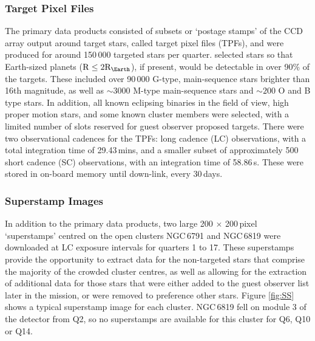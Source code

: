 \subsubsection{Target Pixel Files}
The primary data products consisted of subsets or `postage stamps' of the CCD array output around target stars, called target pixel files (TPFs), and were produced for around 150\,000 targeted stars per quarter. \cite{batalha_selection_2010} selected stars so that Earth-sized planets ($\mathrm{R} \leq 2\mathrm{R_{\Earth}}$), if present, would be detectable in over 90\% of the targets. These included over 90\,000 G-type, main-sequence stars brighter than 16th magnitude, as well as $\sim 3000$ M-type main-sequence stars and $\sim 200$ O and B type stars. In addition, all known eclipsing binaries in the field of view, high proper motion stars, and some known cluster members were selected, with a limited number of slots reserved for guest observer proposed targets. There were two observational cadences for the TPFs: long cadence (LC) observations, with a total integration time of 29.43\,mins, and a smaller subset of approximately 500 short cadence (SC) observations, with an integration time of 58.86\,s. These were stored in on-board memory until down-link, every 30\,days. 

\subsubsection{Superstamp Images}
In addition to the primary data products, two large 200 $\times$ 200\,pixel `superstamps' centred on the open clusters NGC\,6791 and NGC\,6819 were downloaded at LC exposure intervals for quarters 1 to 17. These superstamps provide the opportunity to extract data for the non-targeted stars that comprise the majority of the crowded cluster centres, as well as allowing for the extraction of additional data for those stars that were either added to the guest observer list later in the \Kepler{} mission, or were removed to preference other stars. Figure \ref{fig:SS} shows a typical superstamp image for each cluster. NGC\,6819 fell on module 3 of the detector from Q2, so no superstamps are available for this cluster for Q6, Q10 or Q14.

